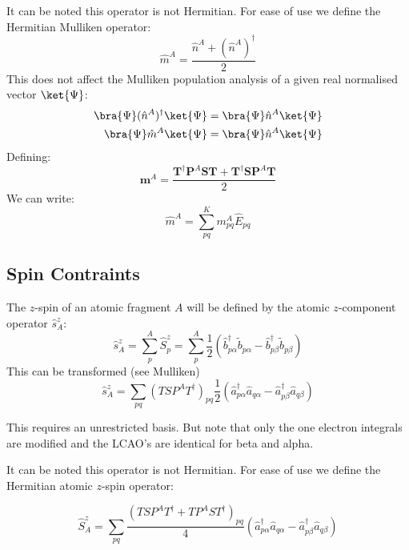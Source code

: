   It can be noted this operator is not Hermitian. For ease of use we define the Hermitian Mulliken operator:
  \begin{equation}
    \hat{m}^A = \frac{\hat{n}^A + (\hat{n}^A)^\dagger}{2}
  \end{equation}
  This does not affect the Mulliken population analysis of a given real normalised vector $\ket{\Psi}$:
  \begin{align}
   \bra{\Psi} (\hat{n}^{A})^\dagger \ket{\Psi} & =   \bra{\Psi} \hat{n}^{A} \ket{\Psi} \\
    \bra{\Psi} \hat{m}^{A} \ket{\Psi} & =  \bra{\Psi} \hat{n}^{A} \ket{\Psi}
  \end{align}
  Defining:
  \begin{equation}
  \textbf{m}^{A} = \frac{\textbf{T}^{\dagger}  \textbf{P}^A  \textbf{S} \textbf{T} + \textbf{T}^{\dagger}  \textbf{S}  \textbf{P}^A \textbf{T}}{2}
  \end{equation}
  We can write:
  \begin{equation}
  \hat{m}^{A} = \sum^K_{pq} m^A_{pq}  \hat{E}_{pq}
  \end{equation}
  

  \subsection{Spin Contraints}
  The $z$-spin of an atomic fragment $A$ will be defined by the atomic $z$-component operator $\hat{s}^{z}_A$:
  \begin{equation}
   \hat{s}^{z}_A = \sum_p^A \hat{S}^{z}_p = \sum_p^A \frac{1}{2} (\hat{b}_{p \alpha}^\dagger \widetilde{b}_{p \alpha} - \hat{b}_{p \beta}^\dagger \widetilde{b}_{p \beta})
  \end{equation}
  This can be transformed (see Mulliken)
  \begin{equation}
   \hat{s}^{z}_A = \sum_{pq} (T S P^A T^\dagger)_{pq} \frac{1}{2} (\hat{a}_{p \alpha}^\dagger \hat{a}_{q \alpha} - \hat{a}_{p \beta}^\dagger \hat{a}_{q \beta})
  \end{equation}

  This requires an unrestricted basis. But note that only the one electron integrals are modified and the LCAO's are identical for beta and alpha. 

  It can be noted this operator is not Hermitian. For ease of use we define the Hermitian atomic $z$-spin operator:  

  \begin{equation}
    \hat{S}^{z}_A = \sum_{pq}  \frac{(T S P^A T^\dagger + T P^A S T^\dagger)_{pq}}{4}  (\hat{a}_{p \alpha}^\dagger \hat{a}_{q \alpha} - \hat{a}_{p \beta}^\dagger \hat{a}_{q \beta})
  \end{equation}

